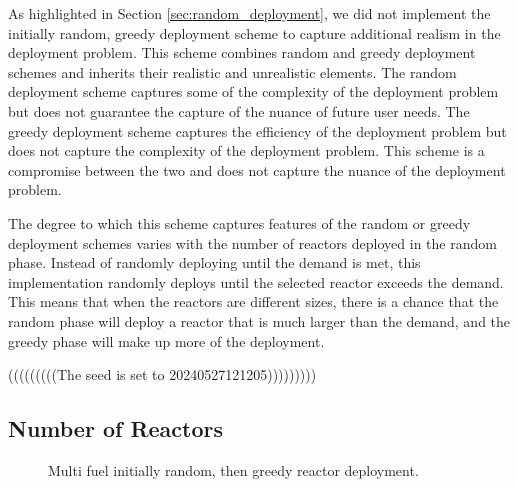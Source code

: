 As highlighted in Section \ref{sec:random_deployment}, we did not implement the
initially random, greedy deployment scheme to capture additional realism in the
deployment problem. This scheme combines random and greedy deployment schemes
and inherits their realistic and unrealistic elements. The random deployment
scheme captures some of the complexity of the deployment problem but does not
guarantee the capture of the nuance of future user needs. The greedy deployment
scheme captures the efficiency of the deployment problem but does not capture
the complexity of the deployment problem. This scheme is a compromise between
the two and does not capture the nuance of the deployment problem.

The degree to which this scheme captures features of the random or greedy
deployment schemes varies with the number of reactors deployed in the random
phase. Instead of randomly deploying until the demand is met, this
implementation randomly deploys until the selected reactor exceeds the demand.
This means that when the reactors are different sizes, there is a chance that
the random phase will deploy a reactor that is much larger than the demand, and
the greedy phase will make up more of the deployment.


(((((((((The seed is set to 20240527121205)))))))))


\subsection{Number of Reactors}
\label{sec:rand_greed_reactors}


\begin{figure}[H]
    \hfill
    \caption{Multi fuel initially random, then greedy reactor deployment.}
    \label{fig:rand_greed_mf_reactors}
  \end{figure}

